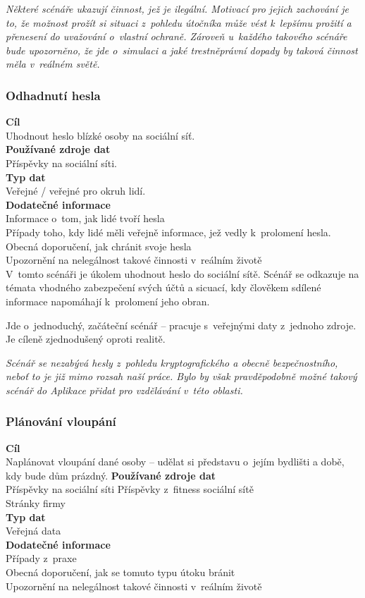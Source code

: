 \textit{Některé scénáře ukazují činnost, jež je ilegální. Motivací pro jejich zachování je to, že  možnost prožít si situaci z~pohledu útočníka může vést k~lepšímu prožití a přenesení do uvažování o~vlastní ochraně. Zároveň u~každého takového scénáře bude upozorněno, že jde o~simulaci a jaké trestněprávní dopady by taková činnost měla v~reálném světě.}

\subsubsection*{Odhadnutí hesla}
\textbf{Cíl}\\
Uhodnout heslo blízké osoby na sociální síť.\\
\textbf{Používané zdroje dat}\\
Příspěvky na sociální síti.\\
\textbf{Typ dat}\\
Veřejné / veřejné pro okruh lidí.\\
\textbf{Dodatečné informace}\\
Informace o~tom, jak lidé tvoří hesla\\
Případy toho, kdy lidé měli veřejně informace, jež vedly k~prolomení hesla.\\
Obecná doporučení, jak chránit svoje hesla\\
Upozornění na nelegálnost takové činnosti v~reálním životě\\

V~tomto scénáři je úkolem uhodnout heslo do sociální sítě. Scénář se odkazuje na témata vhodného zabezpečení svých účtů a sicuací, kdy člověkem sdílené informace napomáhají k~prolomení jeho obran.

Jde o~jednoduchý, začáteční scénář -- pracuje s~veřejnými daty z~jednoho zdroje. Je cíleně zjednodušený oproti realitě.

\textit{Scénář se nezabývá hesly z~pohledu kryptografického a obecně bezpečnostního, neboť to je již mimo rozsah naší práce. Bylo by však pravděpodobně možné takový scénář do Aplikace přidat pro vzdělávání v~této oblasti.}


\subsubsection*{Plánování vloupání}
\textbf{Cíl}\\
Naplánovat vloupání dané osoby -- udělat si představu o~jejím bydlišti a době, kdy bude dům prázdný.
\textbf{Používané zdroje dat}\\
Příspěvky na sociální síti
Příspěvky z~fitness sociální sítě\\
Stránky firmy\\
\textbf{Typ dat}\\
Veřejná data\\
\textbf{Dodatečné informace}\\
Případy z~praxe\\
Obecná doporučení, jak se tomuto typu útoku bránit\\ 
Upozornění na nelegálnost takové činnosti v~reálním životě\\

